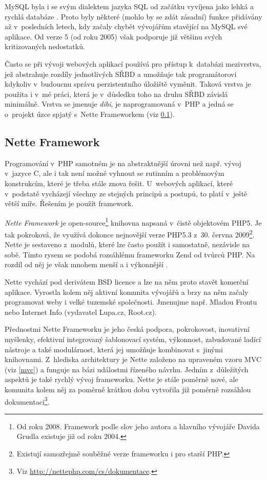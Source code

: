 MySQL byla i se svým dialektem jazyka SQL od začátku vyvíjena jako
lehká a rychlá databáze \cite{sql}. Proto byly některé (mohlo by se
zdát zásadní) funkce přidávány až v~posledních letech, kdy začaly chybět vývojářům
stavějící na MySQL své aplikace. Od verze 5 (od roku 2005) však
podporuje již většinu svých kritizovaných nedostatků.

Často se při vývoji webových aplikací používá pro přístup k~databázi
mezivrstva, jež abstrahuje rozdíly jednotlivých SŘBD a umožňuje tak
programátorovi kdykoliv v~budoucnu správu perzistentního úložiště
vyměnit. Taková vrstva je použita i v~mé práci, která je v~důsledku
toho na druhu SŘBD závislá minimálně. Vrstva se jmenuje {\it dibi},
je naprogramovaná v~PHP a jedná se o~projekt úzce spjatý s~Nette
Frameworkem (viz \ref{nette}).

\subsection{Nette Framework}\label{nette}
Programování v~PHP samotném je na abstraktnější úrovni než např.
vývoj v~jazyce C, ale i tak není možné vyhnout se rutinním a
problémovým konstrukcím, které je třeba stále znova řešit. U~webových
aplikací, které v~podstatě vycházejí všechny ze stejných principů a
postupů, to platí v~ještě větší míře. Řešením je použít framework.

{\it Nette Framework} je open-source\footnote{Od roku 2008. Framework
podle slov jeho autora a hlavního vývojáře Davida Grudla existuje již od
roku 2004.} knihovna napsaná v~čistě objektovém PHP5. Je tak
pokroková, že využívá dokonce nej\-novější verze PHP5.3 z~30. června
2009\footnote{Existují samozřejmě souběžné verze frameworku i pro
starší PHP.}. Nette je sestaveno z~modulů, které lze často použít i
samostatně, nezávisle na sobě. Tímto rysem se podobá rozsáhlému
frameworku Zend od tvůrců PHP. Na rozdíl od něj je však mnohem menší
a i výkonnější \cite{netteTest} \cite{netteCo}.

Nette vychází pod derivátem BSD licence a lze na něm proto stavět
komerční aplikace. Vyrostla kolem něj aktivní komunita vývojářů a brzy
na něm začaly programovat weby i velké tuzemské společnosti. Jmenujme
např. Mladou Frontu nebo Internet Info (vydavatel Lupa.cz, Root.cz).

Přednostmi Nette Frameworku je jeho česká podpora,
pokrokovost, inovativní myšlenky, efektivní integrovaný šablonovací
systém, výkonnost, zabudované ladící nástroje a také modulárnost,
která jej umožňuje kombinovat s~jinými knihovnami. Z~hlediska
architektury je Nette založeno na upraveném vzoru MVC (viz \ref{mvc})
a funguje na bázi událostmi řízeného návrhu. Jedním z~důležitých aspektů je také
rychlý vývoj frameworku. Nette je stále poměrně nové, ale komunita
kolem něj za poměrně krátkou dobu vytvořila již poměrně rozsáhlou
dokumentaci\footnote{Viz \url{http://nettephp.com/cs/dokumentace}.}.
\cite{netteProc}

